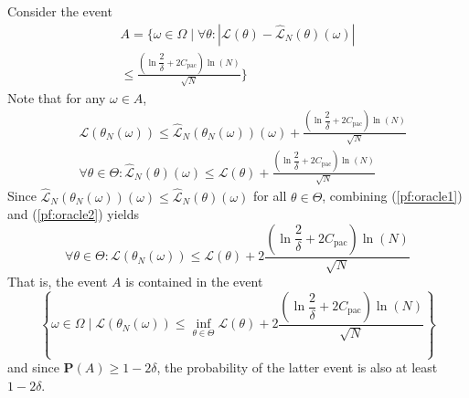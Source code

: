 \documentclass{ifacconf}
\def\eqref#1{(\ref{#1})}
\newcommand{\bP}{\mathbf{P}}
\begin{document}
\begin{pf}
   Consider the event 
   \begin{multline*}
    A=\Big\{ \omega \in \Omega \mid \forall \theta: |\mathcal{L}(\theta) - \hat{\mathcal{L}}_N(\theta)(\omega)| \\ \le \frac{(\ln\dfrac{2}{\delta}+ 2C_{\text{pac}}) \ln(N)}{\sqrt{N}} \Big\}
   \end{multline*}
   Note that for any $\omega \in A$, %
   \begin{align}
      & \mathcal{L}(\theta_N(\omega)) \le \hat{\mathcal{L}}_N(\theta_N(\omega))(\omega) + \frac{(\ln\dfrac{2}{\delta}+ 2C_{\text{pac}}) \ln(N)}{\sqrt{N}} \label{pf:oracle1} \\
      & \forall \theta \in \Theta: \hat{\mathcal{L}}_N(\theta)(\omega) \le 
      \mathcal{L}(\theta) + \frac{(\ln\dfrac{2}{\delta}+ 2C_{\text{pac}}) \ln(N)}{\sqrt{N}} \label{pf:oracle2}
   \end{align}
   Since $\hat{\mathcal{L}}_N(\theta_N(\omega))(\omega) \le \hat{\mathcal{L}}_N(\theta)(\omega)$ for all $\theta \in \Theta$, combining \eqref{pf:oracle1} and \eqref{pf:oracle2} yields 
   \begin{equation}
    \label{pf:oracle3}
      \forall \theta \in \Theta: \mathcal{L}(\theta_N(\omega)) \le \mathcal{L}(\theta) + 2\frac{(\ln\dfrac{2}{\delta}+ 2C_{\text{pac}}) \ln(N)}{\sqrt{N}}
   \end{equation}
   That is, the event $A$ is contained in the event 
   \[
   \left\{\omega \in \Omega \mid  \mathcal{L}(\theta_N(\omega)) \le \inf_{\theta \in \Theta} \mathcal{L}(\theta) + 2\frac{(\ln\dfrac{2}{\delta}+ 2C_{\text{pac}}) \ln(N)}{\sqrt{N}} \right\}
   \]
  and since $\bP(A) \ge 1-2\delta$, the probability of the latter event is also at least $1-2\delta$.
\end{pf}
\end{document}
